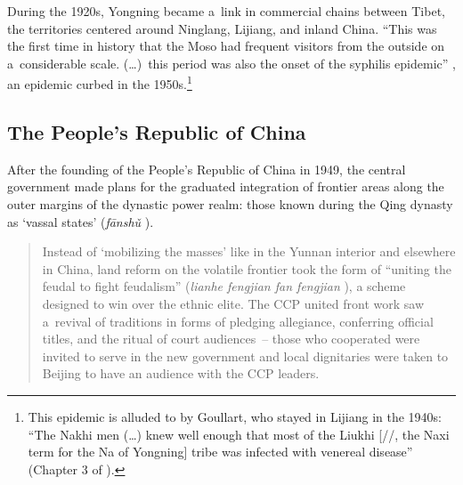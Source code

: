\newpage 
During the 1920s, Yongning became a~link in commercial chains between Tibet, the  territories centered around Ninglang, Lijiang, and inland China. “This was the first time in
history that the Moso had frequent visitors from the outside on a~considerable scale. ({\dots})~this period was also the onset of the syphilis epidemic” \citep{shihetal2002}, an epidemic curbed in the 1950s.\footnote{This epidemic is alluded to by Goullart, who stayed in Lijiang in the 1940s: “The Nakhi men ({\dots}) knew well enough that most of the Liukhi [//, the {Naxi} term for the Na of Yongning] tribe was infected with venereal disease”
	(Chapter 3 of \citealt{goullart1955}).} 

\subsection{The People's Republic of China}
\label{sec:prc}

After the founding of the People's Republic of China in 1949, the central government made plans for the graduated integration of frontier areas along the outer margins of the dynastic power realm: those known during the Qing dynasty as ‘vassal states’ (\textit{fānshǔ} ).

\begin{quotation}
	Instead of ‘mobilizing the masses’ like in the Yunnan interior and elsewhere in China, land reform on the volatile frontier took the form of “uniting the feudal to fight feudalism” (\textit{lianhe fengjian fan fengjian} ), a scheme designed to win over the ethnic elite. The CCP united front work saw a~revival of traditions in forms of pledging allegiance, conferring official titles, and the ritual of court audiences~-- those who cooperated were invited to serve in the new government and local dignitaries were taken to Beijing to have an audience with the CCP leaders. \citep[43-44]{guoState2008}
\end{quotation}

